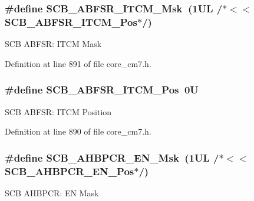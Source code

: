 \subsubsection[{\texorpdfstring{S\+C\+B\+\_\+\+A\+B\+F\+S\+R\+\_\+\+I\+T\+C\+M\+\_\+\+Msk}{SCB_ABFSR_ITCM_Msk}}]{\setlength{\rightskip}{0pt plus 5cm}\#define S\+C\+B\+\_\+\+A\+B\+F\+S\+R\+\_\+\+I\+T\+C\+M\+\_\+\+Msk~(1\+U\+L /$\ast$$<$$<$ S\+C\+B\+\_\+\+A\+B\+F\+S\+R\+\_\+\+I\+T\+C\+M\+\_\+\+Pos$\ast$/)}\hypertarget{group___c_m_s_i_s___s_c_b_gaa8cd31cf3adbe7445c733c0a0a4779da}{}\label{group___c_m_s_i_s___s_c_b_gaa8cd31cf3adbe7445c733c0a0a4779da}
S\+CB A\+B\+F\+SR\+: I\+T\+CM Mask 

Definition at line 891 of file core\+\_\+cm7.\+h.

\subsubsection[{\texorpdfstring{S\+C\+B\+\_\+\+A\+B\+F\+S\+R\+\_\+\+I\+T\+C\+M\+\_\+\+Pos}{SCB_ABFSR_ITCM_Pos}}]{\setlength{\rightskip}{0pt plus 5cm}\#define S\+C\+B\+\_\+\+A\+B\+F\+S\+R\+\_\+\+I\+T\+C\+M\+\_\+\+Pos~0U}\hypertarget{group___c_m_s_i_s___s_c_b_gaf7c22a977aed73cd51317c25286e81c6}{}\label{group___c_m_s_i_s___s_c_b_gaf7c22a977aed73cd51317c25286e81c6}
S\+CB A\+B\+F\+SR\+: I\+T\+CM Position 

Definition at line 890 of file core\+\_\+cm7.\+h.

\subsubsection[{\texorpdfstring{S\+C\+B\+\_\+\+A\+H\+B\+P\+C\+R\+\_\+\+E\+N\+\_\+\+Msk}{SCB_AHBPCR_EN_Msk}}]{\setlength{\rightskip}{0pt plus 5cm}\#define S\+C\+B\+\_\+\+A\+H\+B\+P\+C\+R\+\_\+\+E\+N\+\_\+\+Msk~(1\+U\+L /$\ast$$<$$<$ S\+C\+B\+\_\+\+A\+H\+B\+P\+C\+R\+\_\+\+E\+N\+\_\+\+Pos$\ast$/)}\hypertarget{group___c_m_s_i_s___s_c_b_ga770da9a88e66adb62645f625b0a095cb}{}\label{group___c_m_s_i_s___s_c_b_ga770da9a88e66adb62645f625b0a095cb}
S\+CB A\+H\+B\+P\+CR\+: EN Mask 

